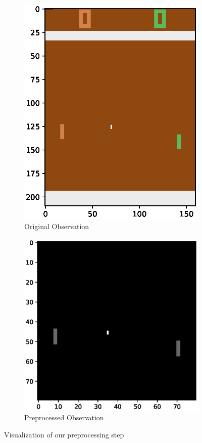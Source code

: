 \documentclass{article}
\begin{document}
\begin{figure}
\centering
\begin{subfigure}{0.45\textwidth}
\centering
\includegraphics[width=\textwidth]{images/pong_example.eps}
\caption{Original Observation}
\end{subfigure}
\begin{subfigure}{0.45\textwidth}
\centering
\includegraphics[width=\textwidth]{images/pong_preprocessed.eps}
\caption{Preprocessed Observation}
\end{subfigure}
\caption{Visualization of our preprocessing step}
\label{fig:preprocess}
\end{figure}
\end{document}
